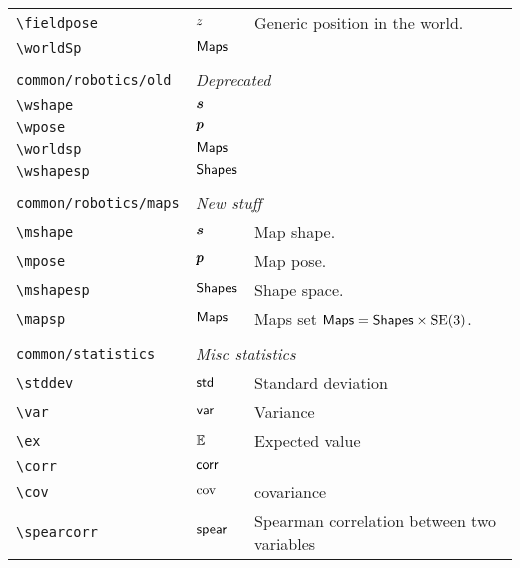 \begin{longtable}{lll}
 {\color[rgb]{0.5,0.5,0.5}\texttt{\textbackslash fieldpose}} & $z$ &  Generic position in the world.\\ 
 {\color[rgb]{0.5,0.5,0.5}\texttt{\textbackslash worldSp}} & $\mathsf{Maps}$ & \\ 
  &  & \\ 
 {\color[rgb]{0.5,0.5,0.5}\texttt{common/robotics/old}} & \multicolumn{2}{l}{\emph{Deprecated}}\\ 
 \hline
{\color[rgb]{0.5,0.5,0.5}\texttt{\textbackslash wshape}} & $\boldsymbol{s}$ & \\ 
 {\color[rgb]{0.5,0.5,0.5}\texttt{\textbackslash wpose}} & $\boldsymbol{p}$ & \\ 
 {\color[rgb]{0.5,0.5,0.5}\texttt{\textbackslash worldsp}} & $\mathsf{Maps}$ & \\ 
 {\color[rgb]{0.5,0.5,0.5}\texttt{\textbackslash wshapesp}} & $\mathsf{Shapes}$ & \\ 
  &  & \\ 
 {\color[rgb]{0.5,0.5,0.5}\texttt{common/robotics/maps}} & \multicolumn{2}{l}{\emph{New stuff}}\\ 
 \hline
{\color[rgb]{0.5,0.5,0.5}\texttt{\textbackslash mshape}} & $\boldsymbol{s}$ &  Map shape.\\ 
 {\color[rgb]{0.5,0.5,0.5}\texttt{\textbackslash mpose}} & $\boldsymbol{p}$ &  Map pose.\\ 
 {\color[rgb]{0.5,0.5,0.5}\texttt{\textbackslash mshapesp}} & $\mathsf{Shapes}$ &  Shape space.\\ 
 {\color[rgb]{0.5,0.5,0.5}\texttt{\textbackslash mapsp}} & $\mathsf{Maps}$ &  Maps set $\mathsf{Maps} = \mathsf{Shapes} \times \mathrm{SE(3)}$.\\ 
  &  & \\ 
 {\color[rgb]{0.5,0.5,0.5}\texttt{common/statistics}} & \multicolumn{2}{l}{\emph{Misc statistics}}\\ 
 \hline
{\color[rgb]{0.5,0.5,0.5}\texttt{\textbackslash stddev}} & $\mathsf{std}$ &  Standard deviation\\ 
 {\color[rgb]{0.5,0.5,0.5}\texttt{\textbackslash var}} & $\mathsf{var}$ &  Variance\\ 
 {\color[rgb]{0.5,0.5,0.5}\texttt{\textbackslash ex}} & $\mathbb{E}$ &  Expected value\\ 
 {\color[rgb]{0.5,0.5,0.5}\texttt{\textbackslash corr}} & $\mathsf{corr}$ & \\ 
 {\color[rgb]{0.5,0.5,0.5}\texttt{\textbackslash cov}} & $\mathrm{cov}$ &  covariance\\ 
 {\color[rgb]{0.5,0.5,0.5}\texttt{\textbackslash spearcorr}} & $\mathsf{spear}$ &  Spearman correlation between two variables\\ 

\end{longtable}
